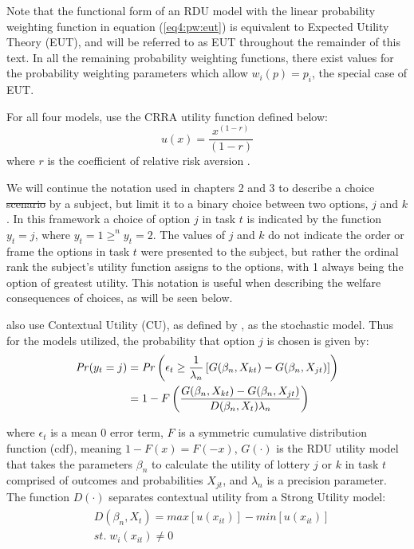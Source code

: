 \documentclass[../main.tex]{subfiles}
\providecommand{\DIFadd}[1]{{\protect\color{blue}\uwave{#1}}} %
\providecommand{\DIFdel}[1]{{\protect\color{red}\sout{#1}}}                      %
\providecommand{\DIFaddbegin}{} %
\providecommand{\DIFaddend}{} %
\providecommand{\DIFdelbegin}{} %
\providecommand{\DIFdelend}{} %
\begin{document}
Note that the functional form of an RDU model with the linear probability weighting function in equation (\ref{eq4:pw:eut}) is equivalent to Expected Utility Theory (EUT), and will be referred to as EUT throughout the remainder of this text.
In all the remaining probability weighting functions, there exist values for the probability weighting parameters which allow $w_i(p) = p_i$, the special case of EUT.

For all four models, \textcite{Harrison2016} use the CRRA utility function defined below:
\begin{equation}
	\label{eq4:CRRA}
	u(x) = \frac{x^{(1-r)}}{(1-r)}
\end{equation}
\noindent where $r$ is the coefficient of relative risk aversion \parencite{Pratt1964}.

We will continue the notation used in chapters 2 and 3 to describe a choice \DIFdelbegin \DIFdel{scenario }\DIFdelend \DIFaddbegin \DIFadd{scenerio }\DIFaddend by a subject, but limit it to a binary choice between two options, $j$ and $k$.
In this framework a choice of option $j$ in task $t$ is indicated by the function $y_t = j$, where $y_t = 1 \geq^n y_t = 2$.
The values of $j$ and $k$ do not indicate the order or frame the options in task $t$ were presented to the subject, but rather the ordinal rank the subject's utility function assigns to the options, with 1 always being the option of greatest utility.
This notation is useful when describing the welfare consequences of choices, as will be seen below.

\textcite{Harrison2016} also use Contextual Utility (CU), as defined by \textcite{Wilcox2008}, as the stochastic model.
Thus for the models utilized, the probability that option $j$ is chosen is given by:
\begin{align}
	\label{eq4:RE.2}
	\begin{split}
		{\ensuremath{\mathit{Pr}}}(y_t = j) &= {\mathit{Pr}}\left(  \epsilon_t \geq \frac{1}{\lambda_n} \left[ G(\beta_n,X_{kt}) - G(\beta_n,X_{jt}) \right] \right)\\
		&= 1 - F\left( \dfrac{G(\beta_n,X_{kt}) - G(\beta_n,X_{jt})}{D(\beta_n,X_t)\lambda_n }  \right)
	\end{split}
\end{align}

\noindent where $\epsilon_t$ is a mean 0 error term, $F$ is a symmetric cumulative distribution function (cdf), meaning $1 - F(x)  = F(-x)$, $G(\cdot)$ is the RDU utility model that takes the parameters $\beta_n$ to calculate the utility of lottery $j$ or $k$ in task $t$ comprised of outcomes and probabilities $X_{jt}$, and $\lambda_n$ is a precision parameter.
The function $D(\cdot)$ separates contextual utility from a Strong Utility model:
\begin{align}
	\label{eq4:W.cu}
	\begin{split}
		&D(\beta_n,X_t) = \mathit{max}[u(x_{it})] - \mathit{min}[u(x_{it})]\\
		&\mathit{st.}\; w_i(x_{it}) \neq 0
	\end{split}
\end{align}
\end{document}
